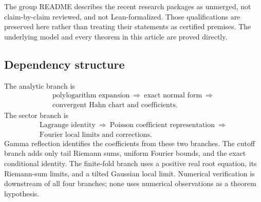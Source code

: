 \documentclass[11pt,a4paper]{article}
\numberwithin{equation}{section}
\theoremstyle{definition}
\theoremstyle{remark}
\begin{document}
The group README describes the recent research packages as unmerged,
not claim-by-claim reviewed, and not Lean-formalized. Those qualifications
are preserved here rather than treating their statements as certified
premises. The underlying model and every theorem in this article are
proved directly.

\subsection{Dependency structure}
The analytic branch is
\begin{gather*}
 \text{polylogarithm expansion}\ \Longrightarrow\ \text{exact normal form}
 \ \Longrightarrow\\
 \text{convergent Hahn chart and coefficients}.
\end{gather*}
The sector branch is
\begin{gather*}
 \text{Lagrange identity}\ \Longrightarrow\ \text{Poisson coefficient representation}
 \ \Longrightarrow\\
 \text{Fourier local limits and corrections}.
\end{gather*}
Gamma reflection identifies the coefficients from these two branches.
The cutoff branch adds only tail Riemann sums, uniform Fourier bounds,
and the exact conditional identity. The finite-fold branch uses a
positive real root equation, its Riemann-sum limits, and a tilted Gaussian
local limit. Numerical verification is downstream of all four branches;
none uses numerical observations as a theorem hypothesis.
\end{document}
